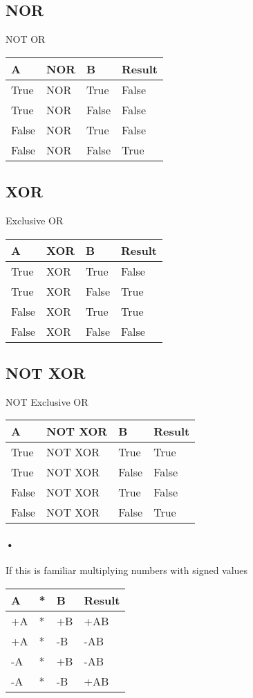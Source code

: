 \documentclass[11pt]{article}
\begin{document}
\subsection{NOR}
NOT OR

\begin{tabular}{lll|l}
A & NOR & B & Result \\
\hline
True & NOR & True & False \\
True & NOR & False & False \\
False & NOR & True & False \\
False & NOR & False & True \\
\hline
\end{tabular}


\subsection{XOR}
Exclusive OR

\begin{tabular}{lll|l}
A & XOR & B & Result \\
\hline
True & XOR & True & False \\
True & XOR & False & True \\
False & XOR & True & True \\
False & XOR & False & False \\
\hline
\end{tabular}


\subsection{NOT XOR}
NOT Exclusive OR

\begin{tabular}{lll|l}
A & NOT XOR & B & Result \\
\hline
True & NOT XOR & True & True \\
True & NOT XOR & False & False \\
False & NOT XOR & True & False \\
False & NOT XOR & False & True \\
\hline
\end{tabular}

\paragraph{•}
If this is familiar multiplying numbers with signed values 


\begin{tabular}{lll|l}
A & * & B & Result \\
\hline
+A & * & +B & +AB \\
+A & * & -B & -AB \\
-A & * & +B & -AB \\
-A & * & -B & +AB \\
\hline
\end{tabular}






\end{document}
